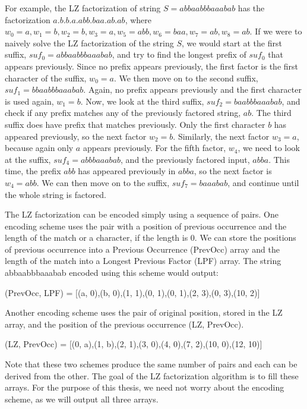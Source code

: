 For example, the LZ factorization of string $S=abbaabbbaaabab$ has the factorization $a.b.b.a.abb.baa.ab.ab$, where $w_0 = a, w_1 = b, w_2 = b, w_3 = a, w_5 = abb, w_6 = baa, w_7 = ab, w_8 = ab$. 
If we were to naively solve the LZ factorization of the string $S$, we would start at the first suffix, $suf_0=abbaabbbaaabab$, and try to find the longest prefix of $suf_0$ that appears previously.
Since no prefix appears previously, the first factor is the first character of the suffix, $w_0 = a$.
We then move on to the second suffix, $suf_1 = bbaabbbaaabab$.
Again, no prefix appears previously and the first character is used again, $w_1 = b$.
Now, we look at the third suffix, $suf_2 = baabbbaaabab$, and check if any prefix matches any of the previously factored string, $ab$.
The third suffix does have prefix that matches previously.
Only the first character $b$ has appeared previously, so the next factor $w_2 = b$.
Similarly, the next factor $w_3 = a$, because again only $a$ appears previously.
For the fifth factor, $w_4$, we need to look at the suffix, $suf_4 = abbbaaabab$, and the previously factored input, $abba$.
This time, the prefix $abb$ has appeared previously in $abba$, so the next factor is $w_4 = abb$.
We can then move on to the suffix, $suf_7 = baaabab$, and continue until the whole string is factored.

The LZ factorization can be encoded simply using a sequence of pairs.
One encoding scheme uses the pair with a position of previous occurrence and the length of the match or a character, if the length is 0.
We can store the positions of previous occurrence into a Previous Occurrence (PrevOcc) array and the length of the match into a Longest Previous Factor (LPF) array.
The string abbaabbbaaabab encoded using this scheme would output:\\
\centerline{(PrevOcc, LPF) = [(a, 0),(b, 0),(1, 1),(0, 1),(0, 1),(2, 3),(0, 3),(10, 2)]}
Another encoding scheme uses the pair of original position, stored in the LZ array, and the position of the previous occurrence (LZ, PrevOcc).\\
\centerline{(LZ, PrevOcc) = [(0, a),(1, b),(2, 1),(3, 0),(4, 0),(7, 2),(10, 0),(12, 10)]}
Note that these two schemes produce the same number of pairs and each can be derived from the other.
The goal of the LZ factorization algorithm is to fill these arrays.
For the purpose of this thesis, we need not worry about the encoding scheme, as we will output all three arrays.

